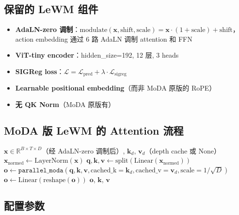 \documentclass[11pt,a4paper]{article}
\begin{document}
\subsection{保留的 LeWM 组件}

\begin{itemize}
  \item \textbf{AdaLN-zero 调制}：$\text{modulate}(\mathbf{x}, \text{shift}, \text{scale}) = \mathbf{x} \cdot (1 + \text{scale}) + \text{shift}$，action embedding 通过 6 路 AdaLN 调制 attention 和 FFN
  \item \textbf{ViT-tiny encoder}：hidden\_size=192, 12 层, 3 heads
  \item \textbf{SIGReg loss}：$\mathcal{L} = \mathcal{L}_{\text{pred}} + \lambda \cdot \mathcal{L}_{\text{sigreg}}$
  \item \textbf{Learnable positional embedding}（而非 MoDA 原版的 RoPE）
  \item \textbf{无 QK Norm}（MoDA 原版有）
\end{itemize}

\subsection{MoDA 版 LeWM 的 Attention 流程}

\begin{algorithm}[H]
\caption{MoDAAttention.forward()}
\begin{algorithmic}[1]
\Require $\mathbf{x} \in \mathbb{R}^{B \times T \times D}$（经 AdaLN-zero 调制后）, $\mathbf{k}_d$, $\mathbf{v}_d$（depth cache 或 None）
\State $\mathbf{x}_{\text{normed}} \gets \text{LayerNorm}(\mathbf{x})$
\State $\mathbf{q}, \mathbf{k}, \mathbf{v} \gets \text{split}(\text{Linear}(\mathbf{x}_{\text{normed}}))$ 
\State $\mathbf{o} \gets \texttt{parallel\_moda}(\mathbf{q}, \mathbf{k}, \mathbf{v}, \text{cached\_k}=\mathbf{k}_d, \text{cached\_v}=\mathbf{v}_d, \text{scale}=1/\sqrt{D})$
\State $\mathbf{o} \gets \text{Linear}(\text{reshape}(\mathbf{o}))$
\State \Return $\mathbf{o}$, $\mathbf{k}$, $\mathbf{v}$ 
\end{algorithmic}
\end{algorithm}

\subsection{配置参数}
\end{document}
